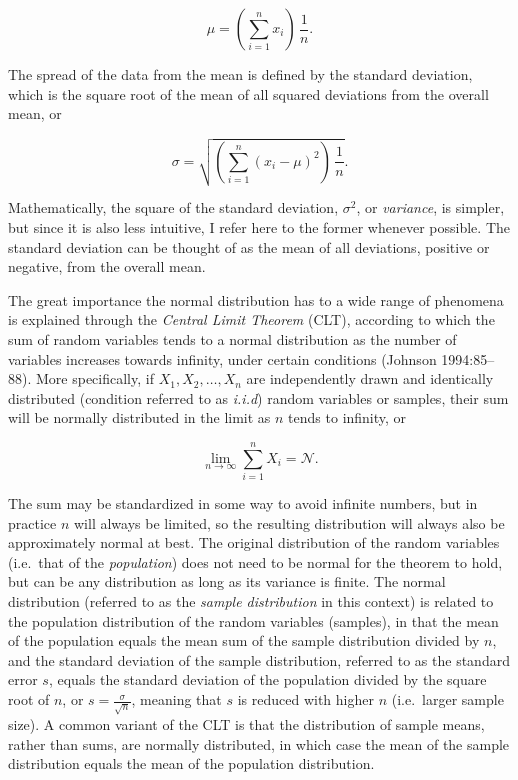 \documentclass[
  12pt,
]{book}
\begin{document}
\begin{equation}
\mu = (\sum_{i=1}^nx_i)\,\frac{1}{n}.
\label{eq:mu}
\end{equation}

The spread of the data from the mean is defined by the standard deviation, which is the square root of the mean of all squared deviations from the overall mean, or

\begin{equation}
\sigma = \sqrt{(\sum_{i=1}^n(x_i-\mu)^2)\,\frac{1}{n}}.
\label{eq:sigma}
\end{equation}

Mathematically, the square of the standard deviation, \(\sigma^2\), or \emph{variance}, is simpler, but since it is also less intuitive, I refer here to the former whenever possible. The standard deviation can be thought of as the mean of all deviations, positive or negative, from the overall mean.

The great importance the normal distribution has to a wide range of phenomena is explained through the \emph{Central Limit Theorem} (CLT), according to which the sum of random variables tends to a normal distribution as the number of variables increases towards infinity, under certain conditions (Johnson 1994:85--88). More specifically, if \(X_1, X_2, \dots, X_n\) are independently drawn and identically distributed (condition referred to as \emph{i.i.d}) random variables or samples, their sum will be normally distributed in the limit as \(n\) tends to infinity, or

\begin{equation}
\lim\limits_{n \to \infty} \sum_{i=1}^n X_i = \mathcal{N}.
\label{eq:CLT}
\end{equation}

The sum may be standardized in some way to avoid infinite numbers, but in practice \(n\) will always be limited, so the resulting distribution will always also be approximately normal at best. The original distribution of the random variables (i.e.~that of the \emph{population}) does not need to be normal for the theorem to hold, but can be any distribution as long as its variance is finite. The normal distribution (referred to as the \emph{sample distribution} in this context) is related to the population distribution of the random variables (samples), in that the mean of the population equals the mean sum of the sample distribution divided by \(n\), and the standard deviation of the sample distribution, referred to as the standard error \(s\), equals the standard deviation of the population divided by the square root of \(n\), or \(s = \frac{\sigma}{\sqrt{n}}\), meaning that \(s\) is reduced with higher \(n\) (i.e.~larger sample size). A common variant of the CLT is that the distribution of sample means, rather than sums, are normally distributed, in which case the mean of the sample distribution equals the mean of the population distribution.
\end{document}

